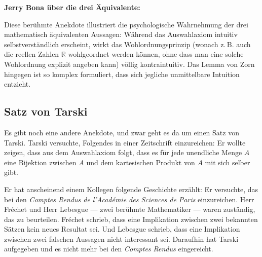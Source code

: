 \begin{didactic-insight}
\textbf{Jerry Bona über die drei Äquivalente:}
\begin{quote}
\end{quote}
Diese berühmte Anekdote illustriert die psychologische Wahrnehmung der drei mathematisch äquivalenten Aussagen: Während das Auswahlaxiom intuitiv selbstverständlich erscheint, wirkt das Wohlordnungsprinzip (wonach z.\,B. auch die reellen Zahlen $\mathbb{R}$ wohlgeordnet werden können, ohne dass man eine solche Wohlordnung explizit angeben kann) völlig kontraintuitiv. Das Lemma von Zorn hingegen ist so komplex formuliert, dass sich jegliche unmittelbare Intuition entzieht.
\end{didactic-insight}

\subsection{Satz von Tarski}

\begin{spoken-clean}[01:08:40 - 01:10:40]
Es gibt noch eine andere Anekdote, und zwar geht es da um einen Satz von Tarski. Tarski versuchte, Folgendes in einer Zeitschrift einzureichen: Er wollte zeigen, dass aus dem Auswahlaxiom folgt, dass es für jede unendliche Menge $A$ eine Bijektion zwischen $A$ und dem kartesischen Produkt von $A$ mit sich selber gibt.

Er hat anscheinend einem Kollegen folgende Geschichte erzählt: Er versuchte, das bei den \emph{Comptes Rendus de l'Académie des Sciences de Paris} einzureichen. Herr Fréchet und Herr Lebesgue --- zwei berühmte Mathematiker --- waren zuständig, das zu beurteilen. Fréchet schrieb, dass eine Implikation zwischen zwei bekannten Sätzen kein neues Resultat sei. Und Lebesgue schrieb, dass eine Implikation zwischen zwei falschen Aussagen nicht interessant sei. Daraufhin hat Tarski aufgegeben und es nicht mehr bei den \emph{Comptes Rendus} eingereicht.
\end{spoken-clean}

\begin{math-stroke}
\end{math-stroke}

